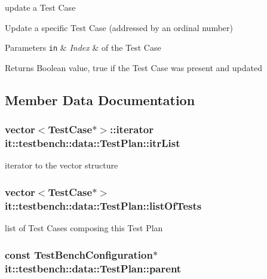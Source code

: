 update a Test Case 

Update a specific Test Case (addressed by an ordinal number)


\begin{DoxyParams}[1]{Parameters}
\mbox{\tt in}  & {\em Index} & of the Test Case \\
\hline
\end{DoxyParams}
\begin{DoxyReturn}{Returns}
Boolean value, true if the Test Case was present and updated 
\end{DoxyReturn}


\subsection{Member Data Documentation}
\hypertarget{classit_1_1testbench_1_1data_1_1TestPlan_aa1e35baeb0392f101d2553319dcc12cf}{
\subsubsection[{itr\-List}]{\setlength{\rightskip}{0pt plus 5cm}vector$<${\bf Test\-Case}$\ast$$>$\-::iterator it\-::testbench\-::data\-::\-Test\-Plan\-::itr\-List\hspace{0.3cm}{\ttfamily [private]}}}\label{db/d7b/classit_1_1testbench_1_1data_1_1TestPlan_aa1e35baeb0392f101d2553319dcc12cf}
iterator to the vector structure \hypertarget{classit_1_1testbench_1_1data_1_1TestPlan_a83df4e37302bb57f0edd2f48caeeb1a9}{
\subsubsection[{list\-Of\-Tests}]{\setlength{\rightskip}{0pt plus 5cm}vector$<${\bf Test\-Case}$\ast$$>$ it\-::testbench\-::data\-::\-Test\-Plan\-::list\-Of\-Tests\hspace{0.3cm}{\ttfamily [private]}}}\label{db/d7b/classit_1_1testbench_1_1data_1_1TestPlan_a83df4e37302bb57f0edd2f48caeeb1a9}
list of Test Cases composing this Test Plan \hypertarget{classit_1_1testbench_1_1data_1_1TestPlan_a79f502dcaa5c97db247d81c4808da43d}{
\subsubsection[{parent}]{\setlength{\rightskip}{0pt plus 5cm}const {\bf Test\-Bench\-Configuration}$\ast$ it\-::testbench\-::data\-::\-Test\-Plan\-::parent\hspace{0.3cm}{\ttfamily [private]}}}\label{db/d7b/classit_1_1testbench_1_1data_1_1TestPlan_a79f502dcaa5c97db247d81c4808da43d}
